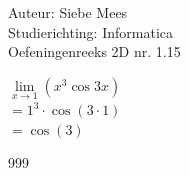 \documentclass[a4paper]{article}
\begin{document}
  
\noindent \large Auteur: Siebe Mees \\
\noindent \large Studierichting: Informatica\\
\noindent \large Oefeningenreeks 2D nr. 1.15\\

\medskip

\normalsize

$\lim\limits_{x\rightarrow 1} (x^3 \cos 3x) $\\

$ = 1^3 \cdot \cos(3\cdot1) $\\

$ = \cos(3) $\\

\begin{thebibliography}{999}
\end{thebibliography}
\end{document}
